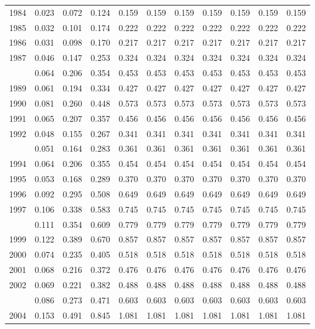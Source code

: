 \documentclass[
]{article}
\begin{document}
\begin{longtable}[t]{lrrrrrrrrrr}
1984 & 0.023 & 0.072 & 0.124 & 0.159 & 0.159 & 0.159 & 0.159 & 0.159 & 0.159 & 0.159\\
1985 & 0.032 & 0.101 & 0.174 & 0.222 & 0.222 & 0.222 & 0.222 & 0.222 & 0.222 & 0.222\\
1986 & 0.031 & 0.098 & 0.170 & 0.217 & 0.217 & 0.217 & 0.217 & 0.217 & 0.217 & 0.217\\
1987 & 0.046 & 0.147 & 0.253 & 0.324 & 0.324 & 0.324 & 0.324 & 0.324 & 0.324 & 0.324\\
\addlinespace
1988 & 0.064 & 0.206 & 0.354 & 0.453 & 0.453 & 0.453 & 0.453 & 0.453 & 0.453 & 0.453\\
1989 & 0.061 & 0.194 & 0.334 & 0.427 & 0.427 & 0.427 & 0.427 & 0.427 & 0.427 & 0.427\\
1990 & 0.081 & 0.260 & 0.448 & 0.573 & 0.573 & 0.573 & 0.573 & 0.573 & 0.573 & 0.573\\
1991 & 0.065 & 0.207 & 0.357 & 0.456 & 0.456 & 0.456 & 0.456 & 0.456 & 0.456 & 0.456\\
1992 & 0.048 & 0.155 & 0.267 & 0.341 & 0.341 & 0.341 & 0.341 & 0.341 & 0.341 & 0.341\\
\addlinespace
1993 & 0.051 & 0.164 & 0.283 & 0.361 & 0.361 & 0.361 & 0.361 & 0.361 & 0.361 & 0.361\\
1994 & 0.064 & 0.206 & 0.355 & 0.454 & 0.454 & 0.454 & 0.454 & 0.454 & 0.454 & 0.454\\
1995 & 0.053 & 0.168 & 0.289 & 0.370 & 0.370 & 0.370 & 0.370 & 0.370 & 0.370 & 0.370\\
1996 & 0.092 & 0.295 & 0.508 & 0.649 & 0.649 & 0.649 & 0.649 & 0.649 & 0.649 & 0.649\\
1997 & 0.106 & 0.338 & 0.583 & 0.745 & 0.745 & 0.745 & 0.745 & 0.745 & 0.745 & 0.745\\
\addlinespace
1998 & 0.111 & 0.354 & 0.609 & 0.779 & 0.779 & 0.779 & 0.779 & 0.779 & 0.779 & 0.779\\
1999 & 0.122 & 0.389 & 0.670 & 0.857 & 0.857 & 0.857 & 0.857 & 0.857 & 0.857 & 0.857\\
2000 & 0.074 & 0.235 & 0.405 & 0.518 & 0.518 & 0.518 & 0.518 & 0.518 & 0.518 & 0.518\\
2001 & 0.068 & 0.216 & 0.372 & 0.476 & 0.476 & 0.476 & 0.476 & 0.476 & 0.476 & 0.476\\
2002 & 0.069 & 0.221 & 0.382 & 0.488 & 0.488 & 0.488 & 0.488 & 0.488 & 0.488 & 0.488\\
\addlinespace
2003 & 0.086 & 0.273 & 0.471 & 0.603 & 0.603 & 0.603 & 0.603 & 0.603 & 0.603 & 0.603\\
2004 & 0.153 & 0.491 & 0.845 & 1.081 & 1.081 & 1.081 & 1.081 & 1.081 & 1.081 & 1.081\\

\end{longtable}
\end{document}
